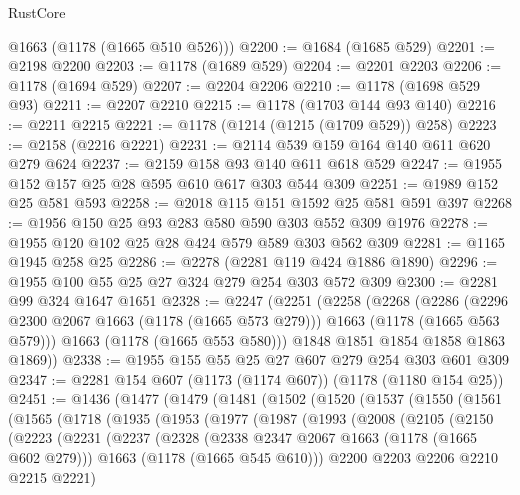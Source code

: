 \begin{lexlean}{RustCore}
\begin{coremodule}
      @1663
      (@1178 (@1665 @510 @526)))
@2200 := @1684 (@1685 @529)
@2201 := @2198 @2200
@2203 := @1178 (@1689 @529)
@2204 := @2201 @2203
@2206 := @1178 (@1694 @529)
@2207 := @2204 @2206
@2210 := @1178 (@1698 @529 @93)
@2211 := @2207 @2210
@2215 := @1178 (@1703 @144 @93 @140)
@2216 := @2211 @2215
@2221 := @1178 (@1214 (@1215 (@1709 @529)) @258)
@2223 := @2158 (@2216 @2221)
@2231 := @2114 @539 @159 @164 @140 @611 @620 @279 @624
@2237 := @2159 @158 @93 @140 @611 @618 @529
@2247 := @1955 @152 @157 @25 @28 @595 @610 @617 @303 @544 @309
@2251 := @1989 @152 @25 @581 @593
@2258 := @2018 @115 @151 @1592 @25 @581 @591 @397
@2268 := @1956 @150 @25 @93 @283 @580 @590 @303 @552 @309 @1976
@2278 := @1955 @120 @102 @25 @28 @424 @579 @589 @303 @562 @309
@2281 := @1165 @1945 @258 @25
@2286 := @2278 (@2281 @119 @424 @1886 @1890)
@2296 := @1955 @100 @55 @25 @27 @324 @279 @254 @303 @572 @309
@2300 := @2281 @99 @324 @1647 @1651
@2328 := @2247
    (@2251
      (@2258
        (@2268
          (@2286
            (@2296 @2300 @2067 @1663 (@1178 (@1665 @573 @279)))
            @1663
            (@1178 (@1665 @563 @579)))
          @1663
          (@1178 (@1665 @553 @580)))
        @1848
        @1851
        @1854
        @1858
        @1863
        @1869))
@2338 := @1955 @155 @55 @25 @27 @607 @279 @254 @303 @601 @309
@2347 := @2281 @154 @607 (@1173 (@1174 @607)) (@1178 (@1180 @154 @25))
@2451 := @1436
    (@1477
      (@1479
        (@1481
          (@1502
            (@1520
              (@1537
                (@1550
                  (@1561
                    (@1565
                      (@1718
                        (@1935
                          (@1953
                            (@1977
                              (@1987
                                (@1993
                                  (@2008
                                    (@2105
                                      (@2150
                                        (@2223
                                          (@2231
                                            (@2237
                                              (@2328
                                                (@2338 @2347 @2067 @1663 (@1178 (@1665 @602 @279)))
                                                @1663
                                                (@1178 (@1665 @545 @610)))
                                              @2200
                                              @2203
                                              @2206
                                              @2210
                                              @2215
                                              @2221)

\end{coremodule}
\end{lexlean}

